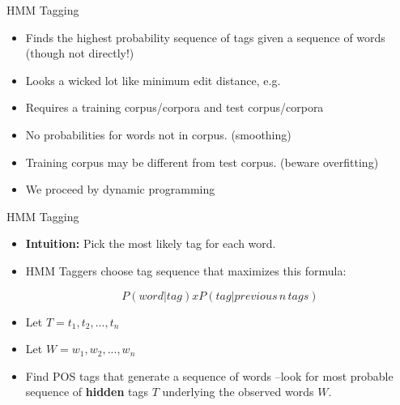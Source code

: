 \documentclass[9pt,xcolor=pdftex,dvipsnames,table]{beamer}
\begin{document}
\begin{frame}{HMM Tagging}

	\begin{itemize}
		\item Finds the highest probability sequence of tags given a sequence of words (though not directly!)
		\item Looks a wicked lot like minimum edit distance, e.g.
		\item Requires a training corpus/corpora and test corpus/corpora
		\item No probabilities for words not in corpus. (smoothing)
		\item Training corpus may be different from test corpus. (beware overfitting)
		\item We proceed by dynamic programming
	\end{itemize}
\end{frame}

\begin{frame}{HMM Tagging}

	\begin{itemize}
		\item \textbf{Intuition:} Pick the most likely tag for each word.
		\item HMM Taggers choose tag sequence that maximizes this formula:
		
			\begin{equation*}P( word | tag ) x P( tag| previous\,n\,tags)\end{equation*}  
			
		\item Let $T = t_1,t_2,..., t_n$
		\item Let $W = w_1,w_2,..., w_n$
		\item Find POS tags that generate a sequence of words --look  for most probable sequence of \textbf{hidden} tags $T$ underlying the observed words $W$.
	\end{itemize}
\end{frame}
\end{document}
